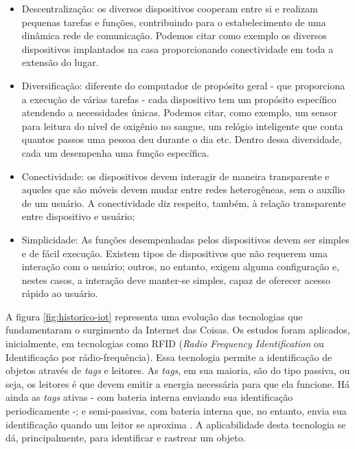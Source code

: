 \begin{itemize}
  \item Descentralização: os diversos dispositivos cooperam entre si e realizam
  pequenas tarefas e funções, contribuindo para o estabelecimento de uma 
  dinâmica rede de comunicação. Podemos citar como exemplo os diversos 
  dispositivos implantados na casa proporcionando conectividade em toda
  a extensão do lugar.

  \item Diversificação: diferente do computador de propósito geral - que 
  proporciona a execução de várias tarefas - cada dispositivo tem um propósito
  específico atendendo a necessidades únicas. Podemos citar, como exemplo, um
  sensor para leitura do nível de oxigênio no sangue, um relógio inteligente
  que conta quantos passos uma pessoa deu durante o dia etc. Dentro dessa 
  diversidade, cada um desempenha uma função específica.

  \item Conectividade: os dispositivos devem interagir de maneira transparente
  e aqueles que são móveis devem mudar entre redes heterogêneas, sem o 
  auxílio de um usuário. A conectividade diz respeito, também, à relação 
  transparente entre dispositivo e usuário; 

  \item Simplicidade: As funções desempenhadas pelos dispositivos devem ser
  simples e de fácil execução. Existem tipos de dispositivos que não requerem 
  uma interação com o usuário; outros, no entanto, exigem alguma configuração e,
  nestes casos, a interação deve manter-se simples, capaz de oferecer acesso
  rápido ao usuário. 

\end{itemize}


A figura \ref{fig:historico-iot} representa uma evolução das tecnologias que
fundamentaram o surgimento da Internet das Coisas. Os estudos foram aplicados,
inicialmente, em tecnologias como RFID (\textit{Radio Frequency Identification}
ou Identificação por rádio-frequência).  Essa tecnologia permite a
identificação de objetos através de \textit{tags} e leitores. As \textit{tags},
em sua maioria, são do tipo passiva, ou seja, os leitores é que devem emitir a
energia necessária para que ela funcione. Há ainda as \textit{tags} ativas -
com bateria interna enviando sua identificação periodicamente -; e
semi-passivas, com bateria interna que, no entanto, envia sua identificação
quando um leitor se aproxima \cite{want2006introduction}. A aplicabilidade
desta tecnologia se dá, principalmente, para identificar e rastrear um objeto.

